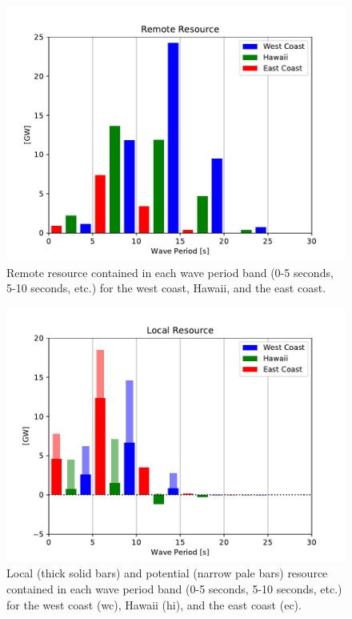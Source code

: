 \begin{figure}[ht]
  \centering
  \includegraphics[width=\linewidth]{../fig/RemoteResource_Freq01.pdf}
  \caption{Remote resource contained in each wave period band (0-5 seconds, 5-10 seconds, etc.) for the west coast, Hawaii, and the east coast.}
  \label{fig:remote-freq}
\end{figure}

\begin{figure}[ht]
  \centering
  \includegraphics[width=\linewidth]{../fig/LocalResource_Freq01.pdf}
  \caption{Local (thick solid bars) and potential (narrow pale bars) resource contained in each wave period band (0-5 seconds, 5-10 seconds, etc.) for the west coast (wc), Hawaii (hi), and the east coast (ec).}
  \label{fig:remote-freq}
\end{figure}

